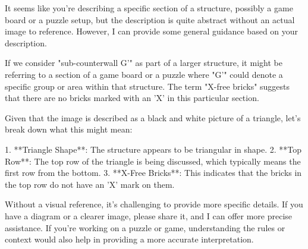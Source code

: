It seems like you're describing a specific section of a structure, possibly a game board or a puzzle setup, but the description is quite abstract without an actual image to reference. However, I can provide some general guidance based on your description.

If we consider "sub-counterwall G'" as part of a larger structure, it might be referring to a section of a game board or a puzzle where "G'" could denote a specific group or area within that structure. The term "X-free bricks" suggests that there are no bricks marked with an 'X' in this particular section.

Given that the image is described as a black and white picture of a triangle, let's break down what this might mean:

1. **Triangle Shape**: The structure appears to be triangular in shape.
2. **Top Row**: The top row of the triangle is being discussed, which typically means the first row from the bottom.
3. **X-Free Bricks**: This indicates that the bricks in the top row do not have an 'X' mark on them.

Without a visual reference, it's challenging to provide more specific details. If you have a diagram or a clearer image, please share it, and I can offer more precise assistance. If you're working on a puzzle or game, understanding the rules or context would also help in providing a more accurate interpretation.